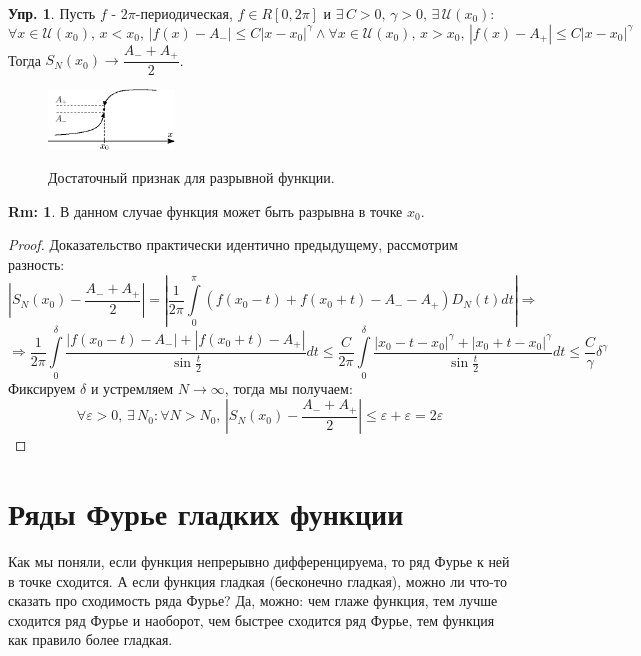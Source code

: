 \documentclass[12pt]{article}
\newcommand{\MU}{\mathcal{U}}
\newcommand{\VE}{\varepsilon}
\theoremstyle{definition}
\newtheorem{rem}{Rm:}
\newtheorem{exrc}{Упр.}
\newcommand{\ddint}[2]{\displaystyle\int\limits_{#1}^{#2}}
\begin{document}
\begin{exrc}
	Пусть $f$ - $2\pi$-периодическая, $f \in R[0,2\pi]$ и $\exists \, C > 0, \, \gamma > 0, \, \exists \, \MU(x_0)$: 
	$$
		 \forall x \in \MU(x_0), \, x < x_0, \, |f(x) - A_{-}| \leq C|x - x_0|^\gamma \wedge \forall x \in \MU(x_0), \, x > x_0, \, |f(x) - A_{+}| \leq C|x - x_0|^\gamma
	$$
	Тогда $S_N(x_0) \to \dfrac{A_{-} + A_{+}}{2}$.
\end{exrc}
\begin{figure}[H]
	\centering
	\includegraphics[width=0.3\textwidth]{MA3L28_2.eps}
	\label{MA3L28_2}
	\caption{Достаточный признак для разрывной функции.}
	\label{fig: Построение функции}
\end{figure}
\begin{rem}
	В данном случае функция может быть разрывна в точке $x_0$.
\end{rem}
\begin{proof}
	Доказательство практически идентично предыдущему, рассмотрим разность:
	$$
		\left|S_N(x_0) - \dfrac{A_{-} + A_{+}}{2}\right|  =\left|\dfrac{1}{2\pi}\ddint{0}{\pi}\left(f(x_0 - t) + f(x_0 +t) - A_{-} - A_{+}\right)D_N(t)dt\right| \Rightarrow
	$$
	$$
		\Rightarrow \dfrac{1}{2\pi}\ddint{0}{\delta}\dfrac{|f(x_0 - t) - A_{-}| + |f(x_0 + t) - A_{+}|}{\sin{\tfrac{t}{2}}}dt  \leq \dfrac{C}{2\pi}\ddint{0}{\delta}\dfrac{|x_0 - t - x_0|^\gamma + |x_0 + t - x_0|^\gamma}{\sin{\tfrac{t}{2}}}dt \leq \dfrac{C}{\gamma}\delta^\gamma
	$$
	Фиксируем $\delta$ и устремляем $N \to \infty$, тогда мы получаем:
	$$
		\forall \VE > 0, \, \exists \, N_0 \colon \forall N > N_0, \, \left|S_N(x_0) - \dfrac{A_{-} + A_{+}}{2}\right|  \leq \VE + \VE = 2\VE
	$$
\end{proof}

\newpage
\section*{Ряды Фурье гладких функции}
Как мы поняли, если функция непрерывно дифференцируема, то ряд Фурье к ней в точке сходится. А если функция гладкая (бесконечно гладкая), можно ли что-то сказать про сходимость ряда Фурье? Да, можно: чем глаже функция, тем лучше сходится ряд Фурье и наоборот, чем быстрее сходится ряд Фурье, тем функция как правило более гладкая.
\end{document}
